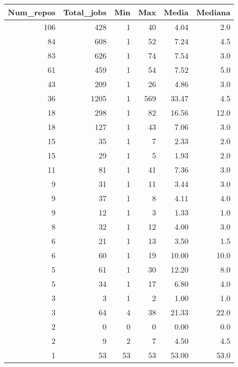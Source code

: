 \begin{tabular}{rrrrrr}
\toprule
 Num\_repos &  Total\_jobs &  Min &  Max &  Media &  Mediana \\
\midrule
       106 &         428 &    1 &   40 &   4.04 &      2.0 \\
        84 &         608 &    1 &   52 &   7.24 &      4.5 \\
        83 &         626 &    1 &   74 &   7.54 &      3.0 \\
        61 &         459 &    1 &   54 &   7.52 &      5.0 \\
        43 &         209 &    1 &   26 &   4.86 &      3.0 \\
        36 &        1205 &    1 &  569 &  33.47 &      4.5 \\
        18 &         298 &    1 &   82 &  16.56 &     12.0 \\
        18 &         127 &    1 &   43 &   7.06 &      3.0 \\
        15 &          35 &    1 &    7 &   2.33 &      2.0 \\
        15 &          29 &    1 &    5 &   1.93 &      2.0 \\
        11 &          81 &    1 &   41 &   7.36 &      3.0 \\
         9 &          31 &    1 &   11 &   3.44 &      3.0 \\
         9 &          37 &    1 &    8 &   4.11 &      4.0 \\
         9 &          12 &    1 &    3 &   1.33 &      1.0 \\
         8 &          32 &    1 &   12 &   4.00 &      3.0 \\
         6 &          21 &    1 &   13 &   3.50 &      1.5 \\
         6 &          60 &    1 &   19 &  10.00 &     10.0 \\
         5 &          61 &    1 &   30 &  12.20 &      8.0 \\
         5 &          34 &    1 &   17 &   6.80 &      4.0 \\
         3 &           3 &    1 &    2 &   1.00 &      1.0 \\
         3 &          64 &    4 &   38 &  21.33 &     22.0 \\
         2 &           0 &    0 &    0 &   0.00 &      0.0 \\
         2 &           9 &    2 &    7 &   4.50 &      4.5 \\
         1 &          53 &   53 &   53 &  53.00 &     53.0 \\

\end{tabular}
